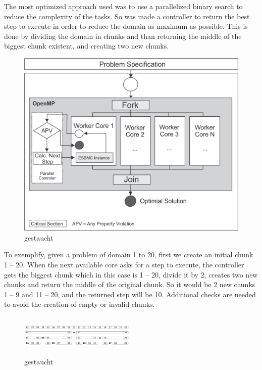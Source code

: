 The most optimized approach used was to use a parallelized binary search to reduce the complexity of the tasks. So was made a controller to return the best step to execute in order to reduce the domain as maximum as possible. This is done by dividing the domain in chunks and than returning the middle of the biggest chunk existent, and creating two new chunks.
\begin{figure}[ht]
	\centering
  \includegraphics[scale=0.75]{Image/esbmc-parallel-Controler.png} 
	\caption{gestaucht}
	\label{fig2}
\end{figure}

To exemplify, given a problem of domain 1 to 20, first we create an initial chunk  1 – 20. When the next available core asks for a step to execute, the controller gets the biggest chunk which in this case is 1 – 20, divide it by 2, creates two new chunks and return the middle of the original chunk. So it would be 2 new chunks 1 – 9 and 11 – 20, and the returned step will be 10. Additional checks are needed to avoid the creation of empty or invalid chunks.
\begin{figure}[ht]
	\centering
  \includegraphics[width=0.49\textwidth, height=75px]{Image/Fig4.png}
	\caption{gestaucht}
	\label{fig2}
\end{figure}

